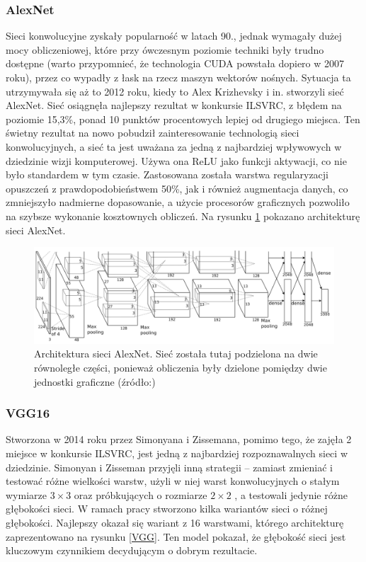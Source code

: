 \documentclass[a4paper,twoside,12pt]{book}
\begin{document}
{\subsubsection{AlexNet}
{Sieci konwolucyjne zyskały popularność w latach 90., jednak wymagały dużej mocy obliczeniowej, które przy ówczesnym poziomie techniki były trudno dostępne (warto przypomnieć, że technologia CUDA powstała dopiero w 2007 roku), przez co wypadły z łask na rzecz maszyn wektorów nośnych\cite{girshick2014rich}. Sytuacja ta utrzymywała się aż to 2012 roku, kiedy to Alex Krizhevsky i in. stworzyli sieć AlexNet\cite{krizhevsky2012imagenet}. Sieć osiągnęła najlepszy rezultat w konkursie ILSVRC, z błędem na poziomie 15,3\%, ponad 10 punktów procentowych lepiej od drugiego miejsca. Ten świetny rezultat na nowo pobudził zainteresowanie technologią sieci konwolucyjnych, a sieć ta jest uważana za jedną z najbardziej wpływowych w dziedzinie wizji komputerowej. Używa ona ReLU jako funkcji aktywacji, co nie było standardem w tym czasie. Zastosowana została warstwa regularyzacji opuszczeń z prawdopodobieństwem 50\%, jak i również augmentacja danych, co zmniejszyło nadmierne dopasowanie, a użycie procesorów graficznych pozwoliło na szybsze wykonanie kosztownych obliczeń. Na rysunku \ref{AlexNet} pokazano architekturę sieci AlexNet.}
\begin{figure}[h]


\centering
\includegraphics[scale=0.24]{alex.png}
\caption{Architektura sieci AlexNet. Sieć została tutaj podzielona na dwie równoległe części, ponieważ obliczenia były dzielone pomiędzy dwie jednostki graficzne (źródło:\cite{krizhevsky2012imagenet})}
\label{AlexNet}
\end{figure}

\subsubsection{VGG16}
\label{vg}
{Stworzona w 2014 roku przez Simonyana i Zissemana\cite{simonyan2014very}, pomimo tego, że zajęła 2 miejsce w konkursie ILSVRC, jest jedną z najbardziej rozpoznawalnych sieci w dziedzinie. Simonyan i Zisseman przyjęli inną strategii – zamiast zmieniać i testować różne wielkości warstw, użyli w niej warst konwolucyjnych o stałym wymiarze $3\times3$ oraz próbkujących o rozmiarze $2\times2$ , a testowali jedynie różne głębokości sieci. W ramach pracy stworzono kilka wariantów sieci o różnej głębokości. Najlepszy okazał się wariant z 16 warstwami, którego architekturę zaprezentowano na rysunku \ref{VGG}. Ten model pokazał, że głębokość sieci jest kluczowym czynnikiem decydującym o dobrym rezultacie.}
\begin{figure}[h!]



\end{figure}}
\end{document}
